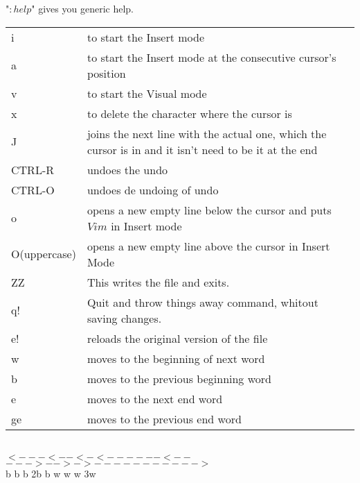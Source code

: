 \documentclass[11p]{book}
\begin{document}
"$:help$" gives you generic help. \\

\begin{tabular}{p{2cm} p{13cm}}
i & to start the Insert mode \\
a & to start the Insert mode at the consecutive cursor's position\\
v & to start the Visual mode \\
x & to delete the character where the cursor is \\
J & joins the next line with the actual one, which the cursor is in and it isn't need to be it at the end \\
CTRL-R & undoes the undo \\
CTRL-O & undoes de undoing of undo \\
o & opens a new empty line below the cursor and puts $Vim$ in Insert mode \\
O(uppercase) & opens a new empty line above the cursor in Insert Mode \\
ZZ & This writes the file and exits. \\
q! & Quit and throw things away command, whitout saving changes. \\
e! & reloads the original version of the file \\
\hline
w & moves to the beginning of next word \\
b & moves to the previous beginning word \\
e & moves to the next end word \\
ge & moves to the previous end word \\
\end{tabular} \\

$<---<--<-<------<--$ \hspace*{1cm} $--->-->->----------->$ \\
\hspace*{1.5cm} b \hspace{0.78cm}b \hspace*{0.5cm} b \hspace*{1cm} 2b \hspace*{1.2cm} b \hspace*{1.5cm} w \hspace*{0.8cm} w \hspace*{0.4cm} w \hspace*{1.5cm} 3w \\
\end{document}
